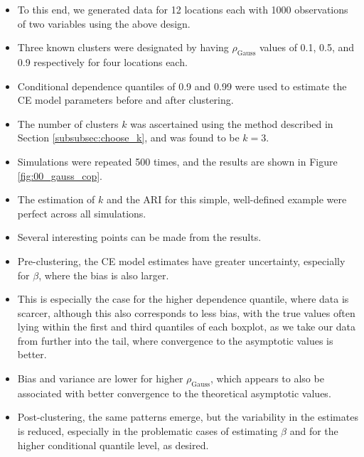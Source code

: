 \documentclass{article}
\numberwithin{equation}{section}
\begin{document}
\begin{itemize}
  \item To this end, we generated data for 12 locations each with 1000 observations of two variables using the above design.
  \item Three known clusters were designated by having $\rho_{\text{Gauss}}$ values of 0.1, 0.5, and 0.9 respectively for four locations each.
  \item Conditional dependence quantiles of 0.9 and 0.99 were used to estimate the CE model parameters before and after clustering. 
  \item The number of clusters $k$ was ascertained using the method described in Section \ref{subsubsec:choose_k}, and was found to be $k = 3$.
  \item Simulations were repeated 500 times, and the results are shown in Figure \ref{fig:00_gauss_cop}.
  \item The estimation of $k$ and the ARI for this simple, well-defined example were perfect across all simulations. 
  \item Several interesting points can be made from the results.
  \item Pre-clustering, the CE model estimates have greater uncertainty, especially for $\beta$, where the bias is also larger.
  \item This is especially the case for the higher dependence quantile, where data is scarcer, although this also corresponds to less bias, with the true values often lying within the first and third quantiles of each boxplot, as we take our data from further into the tail, where convergence to the asymptotic values is better.
  \item Bias and variance are lower for higher $\rho_{\text{Gauss}}$, which appears to also be associated with better convergence to the theoretical asymptotic values.
  \item Post-clustering, the same patterns emerge, but the variability in the estimates is reduced, especially in the problematic cases of estimating $\beta$ and for the higher conditional quantile level, as desired. 
\end{itemize}
\end{document}
